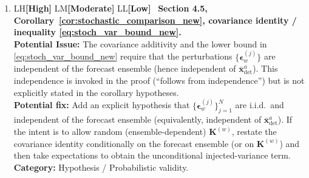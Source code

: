 \documentclass[11pt]{article}
\newcommand{\severity}[1]{%
  \ifx#1H\textcolor{severe}{\textbf{[High]}}\fi
  \ifx#1M\textcolor{moderate}{\textbf{[Moderate]}}\fi
  \ifx#1L\textcolor{minor}{\textbf{[Low]}}\fi
}
\begin{document}
\begin{enumerate}[leftmargin=*,itemsep=0.75em]
\item \severity{L}\ \textbf{Section 4.5, Corollary~\ref{cor:stochastic_comparison_new}, covariance identity / inequality \eqref{eq:stoch_var_bound_new}.}\\
\textbf{Potential Issue:} The covariance additivity and the lower bound in \eqref{eq:stoch_var_bound_new} require that the perturbations \(\{\boldsymbol{\epsilon}_w^{(j)}\}\) are independent of the forecast ensemble (hence independent of \(\bar{\mathbf{x}}^{a}_{\mathrm{det}}\)). This independence is invoked in the proof (“follows from independence”) but is not explicitly stated in the corollary hypotheses.\\
\textbf{Potential fix:} Add an explicit hypothesis that \(\{\boldsymbol{\epsilon}_w^{(j)}\}_{j=1}^N\) are i.i.d.\ and independent of the forecast ensemble (equivalently, independent of \(\bar{\mathbf{x}}^{a}_{\mathrm{det}}\)). If the intent is to allow random (ensemble-dependent) \(\mathbf{K}^{(w)}\), restate the covariance identity conditionally on the forecast ensemble (or on \(\mathbf{K}^{(w)}\)) and then take expectations to obtain the unconditional injected-variance term.\\
\textbf{Category:} Hypothesis / Probabilistic validity.
\end{enumerate}
\end{document}

